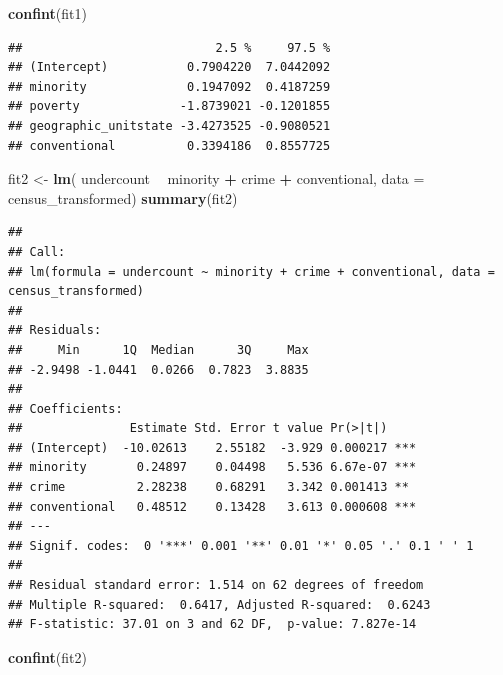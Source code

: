 \documentclass[landscape]{article}
\newenvironment{Shaded}{\begin{snugshade}}{\end{snugshade}}
\newcommand{\KeywordTok}[1]{\textcolor[rgb]{0.13,0.29,0.53}{\textbf{#1}}}
\newcommand{\DataTypeTok}[1]{\textcolor[rgb]{0.13,0.29,0.53}{#1}}
\newcommand{\StringTok}[1]{\textcolor[rgb]{0.31,0.60,0.02}{#1}}
\newcommand{\OperatorTok}[1]{\textcolor[rgb]{0.81,0.36,0.00}{\textbf{#1}}}
\newcommand{\NormalTok}[1]{#1}
\begin{document}
\begin{Shaded}
\begin{Highlighting}[]
\KeywordTok{confint}\NormalTok{(fit1)}
\end{Highlighting}
\end{Shaded}

\begin{verbatim}
##                           2.5 %     97.5 %
## (Intercept)           0.7904220  7.0442092
## minority              0.1947092  0.4187259
## poverty              -1.8739021 -0.1201855
## geographic_unitstate -3.4273525 -0.9080521
## conventional          0.3394186  0.8557725
\end{verbatim}

\newpage

\begin{Shaded}
\begin{Highlighting}[]
\NormalTok{fit2 <-}\StringTok{ }\KeywordTok{lm}\NormalTok{(}
\NormalTok{  undercount }\OperatorTok{~}\StringTok{ }\NormalTok{minority }\OperatorTok{+}\StringTok{ }\NormalTok{crime }\OperatorTok{+}\StringTok{ }\NormalTok{conventional,}
  \DataTypeTok{data =}\NormalTok{ census_transformed)}
\KeywordTok{summary}\NormalTok{(fit2)}
\end{Highlighting}
\end{Shaded}

\begin{verbatim}
## 
## Call:
## lm(formula = undercount ~ minority + crime + conventional, data = census_transformed)
## 
## Residuals:
##     Min      1Q  Median      3Q     Max 
## -2.9498 -1.0441  0.0266  0.7823  3.8835 
## 
## Coefficients:
##               Estimate Std. Error t value Pr(>|t|)    
## (Intercept)  -10.02613    2.55182  -3.929 0.000217 ***
## minority       0.24897    0.04498   5.536 6.67e-07 ***
## crime          2.28238    0.68291   3.342 0.001413 ** 
## conventional   0.48512    0.13428   3.613 0.000608 ***
## ---
## Signif. codes:  0 '***' 0.001 '**' 0.01 '*' 0.05 '.' 0.1 ' ' 1
## 
## Residual standard error: 1.514 on 62 degrees of freedom
## Multiple R-squared:  0.6417, Adjusted R-squared:  0.6243 
## F-statistic: 37.01 on 3 and 62 DF,  p-value: 7.827e-14
\end{verbatim}

\begin{Shaded}
\begin{Highlighting}[]
\KeywordTok{confint}\NormalTok{(fit2)}
\end{Highlighting}
\end{Shaded}
\end{document}
